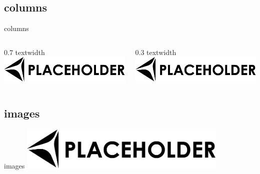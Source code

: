 \documentclass{beamer}
\begin{document}
\subsection{columns}
\begin{frame}{columns}
  \begin{columns}
    \begin{column}{.7\textwidth}
      0.7 textwidth
      \includegraphics[width=\textwidth]{resources/placeholder1}
    \end{column}

    \begin{column}{.3\textwidth}
      0.3 textwidth
      \includegraphics[width=\textwidth]{resources/placeholder1}
    \end{column}
  \end{columns}
\end{frame}

\subsection{images}
\begin{frame}[t]{images}
  \centering
  \includegraphics[width=0.75\textwidth]{resources/placeholder1}
\end{frame}
\end{document}

